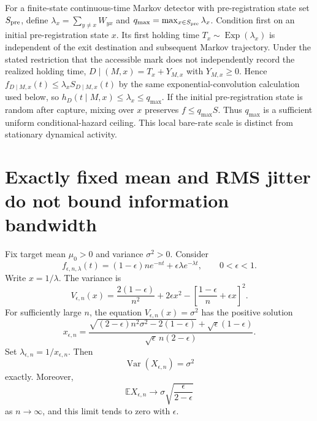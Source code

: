 \documentclass[aps,prapplied,preprint,nofootinbib]{revtex4-2}
\begin{document}
For a finite-state continuous-time Markov detector with pre-registration state set $S_{\rm pre}$, define $\lambda_x=\sum_{y\ne x}W_{yx}$ and $q_{\max}=\max_{x\in S_{\rm pre}}\lambda_x$. Condition first on an initial pre-registration state $x$. Its first holding time $T_x\sim\operatorname{Exp}(\lambda_x)$ is independent of the exit destination and subsequent Markov trajectory. Under the stated restriction that the accessible mark does not independently record the realized holding time, $D\mid(M,x)=T_x+Y_{M,x}$ with $Y_{M,x}\ge0$. Hence $f_{D\mid M,x}(t)\le\lambda_x S_{D\mid M,x}(t)$ by the same exponential-convolution calculation used below, so $h_D(t\mid M,x)\le\lambda_x\le q_{\max}$. If the initial pre-registration state is random after capture, mixing over $x$ preserves $f\le q_{\max}S$. Thus $q_{\max}$ is a sufficient uniform conditional-hazard ceiling. This local bare-rate scale is distinct from stationary dynamical activity.

\section{Exactly fixed mean and RMS jitter do not bound information bandwidth}

Fix target mean $\mu_0>0$ and variance $\sigma^2>0$. Consider
\begin{equation}
f_{\epsilon,n,\lambda}(t)
=(1-\epsilon)ne^{-nt}
+\epsilon\lambda e^{-\lambda t},
\qquad 0<\epsilon<1.
\end{equation}
Write $x=1/\lambda$. The variance is
\begin{equation}
V_{\epsilon,n}(x)
=\frac{2(1-\epsilon)}{n^2}+2\epsilon x^2
-\left[\frac{1-\epsilon}{n}+\epsilon x\right]^2.
\end{equation}
For sufficiently large $n$, the equation $V_{\epsilon,n}(x)=\sigma^2$ has the positive solution
\begin{equation}
\boxed{
x_{\epsilon,n}
=\frac{
\sqrt{(2-\epsilon)n^2\sigma^2-2(1-\epsilon)}
+\sqrt\epsilon(1-\epsilon)
}{
\sqrt\epsilon\,n(2-\epsilon)
}.}
\label{eq:exactx}
\end{equation}
Set $\lambda_{\epsilon,n}=1/x_{\epsilon,n}$. Then
\begin{equation}
\operatorname{Var}(X_{\epsilon,n})=\sigma^2
\end{equation}
exactly. Moreover,
\begin{equation}
\mathbb E X_{\epsilon,n}\to
\sigma\sqrt{\frac{\epsilon}{2-\epsilon}}
\end{equation}
as $n\to\infty$, and this limit tends to zero with $\epsilon$.
\end{document}
